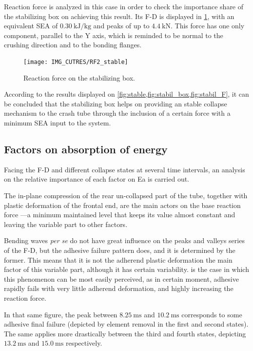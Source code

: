 \documentclass[cmfonts]{witpress}
\begin{document}
Reaction force is analyzed in this case in order to check the importance share of the stabilizing box on achieving this result. Its F-D is displayed in \cref{fig:stabil_F}, with an equivalent SEA of $\SI{0.30}{\kJ/\kg}$ and peaks of up to $\SI{4.4}{\kN}$. This force has one only component, parallel to the Y axis, which is reminded to be normal to the crushing direction and to the bonding flanges.

\begin{figure}
	\centering
	\texttt{[image: IMG\_CUTRES/RF2\_stable]}
	\caption{Reaction force on the stabilizing box.}
	\label{fig:stabil_F}
\end{figure}

According to the results displayed on \cref{fig:stable,fig:stabil_box,fig:stabil_F}, it can be concluded that the stabilizing box helps on providing an stable collapse mechanism to the crash tube through the inclusion of a certain force with a minimum SEA input to the system.

\subsection{Factors on absorption of energy}
\label{sec:Ea_factors}

Facing the F-D and different collapse states at several time intervals, an analysis on the relative importance of each factor on Ea is carried out.

The in-plane compression of the rear un-collapsed part of the tube, together with plastic deformation of the frontal end, are the main actors on the base reaction force ---a minimum maintained level that keeps its value almost constant and leaving the variable part to other factors.

Bending waves \textit{per se} do not have great influence on the peaks and valleys series of the F-D, but the adhesive failure pattern does, and it is determined by the former. This means that it is not the adherend plastic deformation the main factor of this variable part, although it has certain variability.  is the case in which this phenomenon can be most easily perceived, as in certain moment, adhesive rapidly fails with very little adherend deformation, and highly increasing the reaction force.

In that same figure, the peak between $\SI{8.25}{\ms}$ and $\SI{10.2}{\ms}$ corresponds to some adhesive final failure (depicted by element removal in the first and second states). The same applies more drastically between the third and fourth states, depicting $\SI{13.2}{\ms}$ and $\SI{15.0}{\ms}$ respectively.
\end{document}
